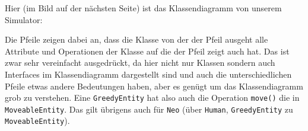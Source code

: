 \begin{questions}
    \bigskip


    \renewcommand{\workingtimeMinutes}{15}

    Hier (im Bild auf der nächsten Seite) ist das Klassendiagramm von unserem Simulator:

    Die Pfeile zeigen dabei an, dass die Klasse von der der Pfeil ausgeht alle Attribute und Operationen der Klasse auf die der Pfeil zeigt auch hat.
    Das ist zwar sehr vereinfacht ausgedrückt, da hier nicht nur Klassen sondern auch Interfaces im Klassendiagramm dargestellt sind und auch die unterschiedlichen Pfeile etwas andere Bedeutungen haben, aber es genügt um das Klassendiagramm grob zu verstehen.
    Eine \texttt{GreedyEntity} hat also auch die Operation \texttt{move()} die in \texttt{MoveableEntity}.
    Das gilt übrigens auch für \texttt{Neo} (über \texttt{Human}, \texttt{GreedyEntity} zu \texttt{MoveableEntity}).



\end{questions}
